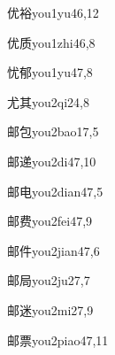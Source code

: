 \begin{verbete}{优裕}{you1yu4}{6,12}
\end{verbete}

\begin{verbete}{优质}{you1zhi4}{6,8}
\end{verbete}

\begin{verbete}{忧郁}{you1yu4}{7,8}
\end{verbete}

\begin{verbete}{尤其}{you2qi2}{4,8}
\end{verbete}

\begin{verbete}{邮包}{you2bao1}{7,5}
\end{verbete}

\begin{verbete}{邮递}{you2di4}{7,10}
\end{verbete}

\begin{verbete}{邮电}{you2dian4}{7,5}
\end{verbete}

\begin{verbete}{邮费}{you2fei4}{7,9}
\end{verbete}

\begin{verbete}{邮件}{you2jian4}{7,6}
\end{verbete}

\begin{verbete}{邮局}{you2ju2}{7,7}
\end{verbete}

\begin{verbete}{邮迷}{you2mi2}{7,9}
\end{verbete}

\begin{verbete}{邮票}{you2piao4}{7,11}
\end{verbete}

